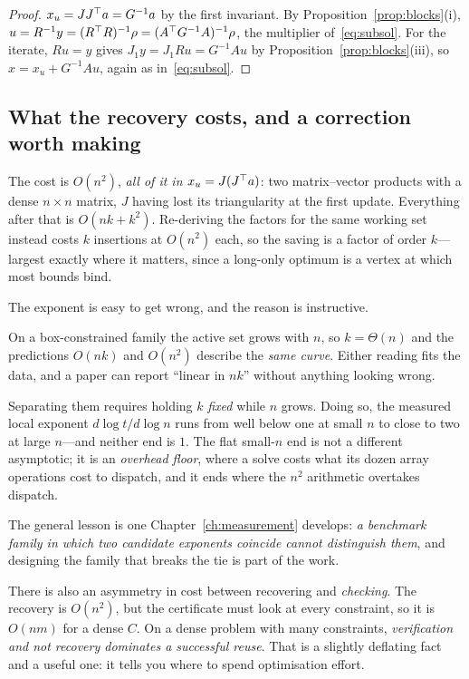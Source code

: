 \begin{proof}
$x_u = JJ^{\top} a = G^{-1}a$ by the first invariant. By
Proposition~\ref{prop:blocks}(i), $u = R^{-1}y = (R^{\top} R)^{-1}\rho = (A^{\top} G^{-1}A)^{-1}\rho$,
the multiplier of~\eqref{eq:subsol}. For the iterate, $Ru = y$ gives
$J_1 y = J_1 R u = G^{-1}Au$ by Proposition~\ref{prop:blocks}(iii), so
$x = x_u + G^{-1}Au$, again as in~\eqref{eq:subsol}.
\end{proof}

\subsection{What the recovery costs, and a correction worth making}

The cost is $O(n^2)$, \emph{all of it in $x_u = J(J^{\top} a)$}: two matrix--vector products
with a dense $n\times n$ matrix, $J$ having lost its triangularity at the first update.
Everything after that is $O(nk + k^2)$. Re-deriving the factors for the same working
set instead costs $k$ insertions at $O(n^2)$ each, so the saving is a factor of order
$k$---largest exactly where it matters, since a long-only optimum is a vertex at which
most bounds bind.

The exponent is easy to get wrong, and the reason is instructive.

\begin{remark}
\label{rem:exponent}
On a box-constrained family the active set grows with $n$, so $k = \Theta(n)$ and the
predictions $O(nk)$ and $O(n^2)$ describe the \emph{same curve}. Either reading fits
the data, and a paper can report ``linear in $nk$'' without anything looking wrong.

Separating them requires holding $k$ \emph{fixed} while $n$ grows. Doing so, the
measured local exponent $d\log t/d\log n$ runs from well below one at small $n$ to
close to two at large $n$---and neither end is $1$. The flat small-$n$ end is not a
different asymptotic; it is an \emph{overhead floor}, where a solve costs what its
dozen array operations cost to dispatch, and it ends where the $n^2$ arithmetic
overtakes dispatch.

The general lesson is one Chapter~\ref{ch:measurement} develops: \emph{a benchmark
family in which two candidate exponents coincide cannot distinguish them}, and
designing the family that breaks the tie is part of the work.
\end{remark}

There is also an asymmetry in cost between recovering and \emph{checking}. The recovery
is $O(n^2)$, but the certificate must look at every constraint, so it is $O(nm)$ for a
dense $C$. On a dense problem with many constraints, \emph{verification and not
recovery dominates a successful reuse}. That is a slightly deflating fact and a useful
one: it tells you where to spend optimisation effort.

